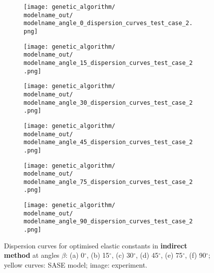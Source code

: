 \documentclass[preprint,12pt]{elsarticle}
\begin{document}
\begin{figure} [h!]
	\newcommand{\modelname}{ga_plain_weave_known_mass}
	\centering
	\begin{subfigure}[b]{0.49\textwidth}
		\centering
			\texttt{[image: genetic\_algorithm/\\modelname\_out/\\modelname\_angle\_0\_dispersion\_curves\_test\_case\_2.png]}
		\caption{}
		\label{fig:dispersion0deg}
	\end{subfigure}
	\begin{subfigure}[b]{0.49\textwidth}
		\centering
		\texttt{[image: genetic\_algorithm/\\modelname\_out/\\modelname\_angle\_15\_dispersion\_curves\_test\_case\_2.png]}
		\caption{}
		\label{fig:dispersion15deg}
	\end{subfigure}
   \begin{subfigure}[b]{0.49\textwidth}
	   	\centering
	   	\texttt{[image: genetic\_algorithm/\\modelname\_out/\\modelname\_angle\_30\_dispersion\_curves\_test\_case\_2.png]}
	   	\caption{}
	   	\label{fig:dispersion30deg}
   \end{subfigure}
	\begin{subfigure}[b]{0.49\textwidth}
		\centering
		\texttt{[image: genetic\_algorithm/\\modelname\_out/\\modelname\_angle\_45\_dispersion\_curves\_test\_case\_2.png]}
		\caption{}
		\label{fig:dispersion45deg}
	\end{subfigure}
	\begin{subfigure}[b]{0.49\textwidth}
		\centering
		\texttt{[image: genetic\_algorithm/\\modelname\_out/\\modelname\_angle\_75\_dispersion\_curves\_test\_case\_2.png]}
		\caption{}
		\label{fig:dispersion75deg}
	\end{subfigure}
    \begin{subfigure}[b]{0.49\textwidth}
    	\centering
    	\texttt{[image: genetic\_algorithm/\\modelname\_out/\\modelname\_angle\_90\_dispersion\_curves\_test\_case\_2.png]}
    	\caption{}
    	\label{fig:dispersion90deg}
    \end{subfigure}
	\caption{Dispersion curves for optimised elastic constants in \textbf{indirect method} at angles $\beta$: (a) 0$^{\circ}$, (b) 15$^{\circ}$, (c) 30$^{\circ}$, (d) 45$^{\circ}$, (e) 75$^{\circ}$, (f) 90$^{\circ}$; yellow curves: SASE model; image: experiment. }
	\label{fig:optimized}
\end{figure}

\clearpage
\end{document}
